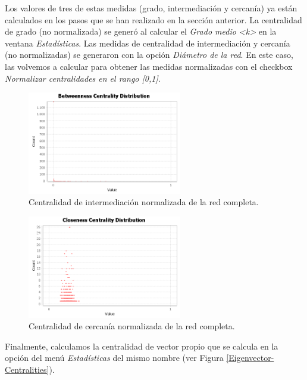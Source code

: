 \documentclass{uimppracticas}
\begin{document}
Los valores de tres de estas medidas (grado, intermediación y cercanía) ya están calculados en los pasos que se han realizado en la sección anterior. La centralidad de grado (no normalizada) se generó al calcular el \textit{Grado medio <k>} en la ventana \textit{Estadísticas}. Las medidas de centralidad de intermediación y cercanía (no normalizadas) se generaron con la opción \textit{Diámetro de la red}. En este caso, las volvemos a calcular para obtener las medidas normalizadas con el checkbox \textit{Normalizar centralidades en el rango [0,1]}.

\begin{figure}[H]
	\centering
	\includegraphics[width=0.6\textwidth]{images/Betweenness-Centrality-Distribution-Norm}
	\caption{Centralidad de intermediación normalizada de la red completa.}
	\label{Betweenness-Centrality-Distribution-Norm}
\end{figure}

\begin{figure}[H]
	\centering
	\includegraphics[width=0.6\textwidth]{images/Closeness-Centrality-Distribution-Norm}
	\caption{Centralidad de cercanía normalizada de la red completa.}
	\label{Closeness-Centrality-Distribution-Norm}
\end{figure}

Finalmente, calculamos la centralidad de vector propio que se calcula en la opción del menú \textit{Estadísticas} del mismo nombre (ver Figura \ref{Eigenvector-Centralities}).
\end{document}
